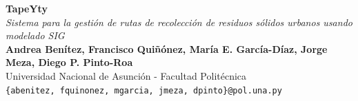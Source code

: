 \documentclass[a0,portrait, final]{a0poster}
\begin{document}



\begin{minipage}[bt]{0.6\linewidth}
\veryHuge \color{NavyBlue} \textbf{TapeYty} 
\color{Black}\\[1cm] %
\Huge\textit{Sistema para la gestión de rutas de recolección de residuos sólidos urbanos usando modelado SIG}\\[1cm] %
\LARGE \textbf{Andrea Benítez, Francisco Quiñónez, María E. García-Díaz, Jorge Meza, Diego P. Pinto-Roa}\\[0.5cm]
\LARGE Universidad Nacional de Asunci\'on - 
\Large Facultad Politécnica\\[0.4cm] 
\large \texttt{\{abenitez, fquinonez, mgarcia, jmeza, dpinto\}@pol.una.py}
\end{minipage}
%
\end{document}
